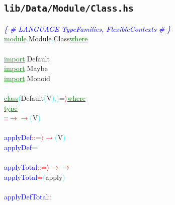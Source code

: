 \subsection{\texttt{lib/Data/Module/Class.hs}}
\label{mod:Data.Module.Class}
\textcolor{blue}{{\it{}\{-\# LANGUAGE TypeFamilies, FlexibleContexts \#-\}}}\\\textcolor{green}{\underline{module}}\textcolor{cyan}{.}{\rm{}Module}\textcolor{cyan}{.}{\rm{}Class}\hsspace \textcolor{green}{\underline{where}}\\\\\textcolor{green}{\underline{import}}\textcolor{cyan}{.}{\rm{}Default}\\\textcolor{green}{\underline{import}}\textcolor{cyan}{.}{\rm{}Maybe}\\\textcolor{green}{\underline{import}}\textcolor{cyan}{.}{\rm{}Monoid}\\\\\textcolor{green}{\underline{class}}\hsspace \textcolor{cyan}{(}{\rm{}Default}\hsspace \textcolor{cyan}{(}{\rm{}V}\textcolor{cyan}{)}\textcolor{cyan}{,}\textcolor{cyan}{)}\hsspace \textcolor{red}{=\ensuremath{\rangle}}\hsspace \textcolor{green}{\underline{where}}\\\hstab \textcolor{green}{\underline{type}}\\\hsspace \textcolor{red}{::}\hsspace \textcolor{red}{\ensuremath{\rightarrow}}\hsspace \textcolor{red}{\ensuremath{\rightarrow}}\hsspace \textcolor{cyan}{(}{\rm{}V}\textcolor{cyan}{)}\\\\\textcolor{blue}{applyDef}\hsspace \textcolor{red}{::}\hsspace \textcolor{red}{=\ensuremath{\rangle}}\hsspace \textcolor{red}{\ensuremath{\rightarrow}}\hsspace \textcolor{cyan}{(}{\rm{}V}\textcolor{cyan}{)}\\\textcolor{blue}{applyDef}\hsspace \textcolor{red}{=}\\\\\textcolor{blue}{applyTotal}\hsspace \textcolor{red}{::}\hsspace \textcolor{red}{=\ensuremath{\rangle}}\hsspace \textcolor{red}{\ensuremath{\rightarrow}}\hsspace \textcolor{red}{\ensuremath{\rightarrow}}\\\textcolor{blue}{applyTotal}\hsspace \textcolor{red}{=}\hsspace \textcolor{cyan}{(}{\rm{}apply}\textcolor{cyan}{)}\\\\\textcolor{blue}{applyDefTotal}\hsspace \textcolor{red}{::}\hsspace 